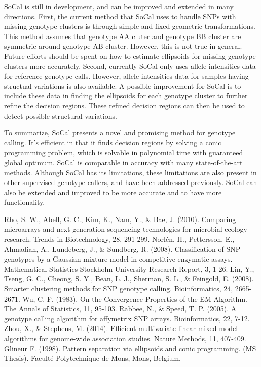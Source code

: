 \documentclass{scrartcl}
\begin{document}
\par
SoCal is still in development, and can be improved and extended in
many directions.
First, the current method that SoCal uses to handle SNPs with missing genotype
clusters is through simple and fixed geometric transformations.
This method assumes that genotype AA cluter and genotype BB cluster are
symmetric around genotype AB cluster.
However, this is not true in general.
Future efforts should be spent on how to estimate ellipsoids for missing
genotype clusters more accurately.
Second, currently SoCal only uses allele intensities data for reference
genotype calls.
However, allele intensities data for samples having structual variations is
also available.
A possible improvement for SoCal is to include these data in finding the
ellipsoids for each genotype cluster to further refine the decision regions.
These refined decision regions can then be used to detect possible structural
variations.

\par
To summarize, SoCal presents a novel and promising method for genotype calling.
It's efficient in that it finds decision regions by solving a conic
programming problem, which is solvable in polynomial time with guaranteed
global optimum.
SoCal is comparable in accuracy with many state-of-the-art methods.
Although SoCal has its limitations, these limitations are also present in other
supervised genotype callers, and have been addressed previously.
SoCal can also be extended and improved to be more accurate and to have more
functionality.




\begin{thebibliography}{9}
Rho, S. W., Abell, G. C., Kim, K., Nam, Y., \& Bae, J. (2010).
Comparing microarrays and next-generation sequencing technologies for microbial
ecology research. Trends in Biotechnology, 28, 291-299.
Norl\'{e}n, H., Pettersson, E., Ahmadian, A., Lundeberg, J., \& Sundberg, R.
(2008). Classification of SNP genotypes by a Gaussian mixture model in
competitive enzymatic assays.
Mathematical Statistics Stockholm University Research Report, 3, 1-26.
Lin, Y., Tseng, G. C., Cheong, S. Y., Bean, L. J., Sherman, S. L., \&
Feingold, E. (2008). Smarter clustering methods for SNP genotype calling.
Bioinformatics, 24, 2665-2671.
Wu, C. F. (1983). On the Convergence Properties of the EM Algorithm.
The Annals of Statistics, 11, 95-103.
Rabbee, N., \& Speed, T. P. (2005).
A genotype calling algorithm for affymetrix SNP arrays.
Bioinformatics, 22, 7-12.
Zhou, X., \& Stephens, M. (2014).
Efficient multivariate linear mixed model algorithms for genome-wide
association studies.
Nature Methods, 11, 407-409.
Glineur F. (1998). Pattern separation via ellipsoids and conic programming.
(MS Thesis). Faculté Polytechnique de Mons, Mons, Belgium.
\end{thebibliography}
\end{document}
